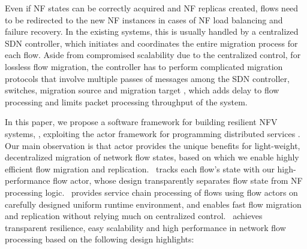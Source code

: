 Even if NF states can be correctly acquired and NF replicas created, flows need to be redirected to the new NF instances in cases of NF load balancing and failure recovery. In the existing systems, this is usually handled by a centralized SDN controller, which initiates and coordinates the entire migration process for each flow. Aside from compromised scalability due to the centralized control, for lossless flow migration, the controller has to perform complicated migration protocols that involve multiple passes of messages among the SDN controller, switches, migration source and migration target \cite{gember2015opennf}, which adds delay to flow processing and limits packet processing throughput of the system.


In this paper, we propose a software framework for building resilient NFV systems, \nfactor, exploiting the actor framework for programming distributed services \cite{actor-wiki, akka, newell2016optimizing}. Our main observation is that actor provides the unique benefits for light-weight, decentralized migration of network flow states, based on which we enable highly efficient flow migration and replication. %
\nfactor~tracks each flow's state with our high-performance flow actor, whose design transparently separates flow state from NF processing logic. \nfactor~provides service chain processing of flows using flow actors on carefully designed uniform runtime environment, and enables fast flow migration and replication without relying much on centralized control. 
\nfactor~achieves transparent resilience, easy scalability and high performance in network flow processing based on the following design highlights: %

